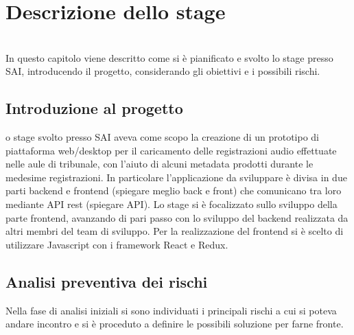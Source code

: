 
\chapter{Descrizione dello stage}
\label{cap:descrizione-stage}

\\

In questo capitolo viene descritto come si è pianificato e svolto lo stage presso SAI, introducendo il progetto, considerando gli obiettivi e i possibili rischi.

\section{Introduzione al progetto}

o stage svolto presso SAI aveva come scopo la creazione di un prototipo di piattaforma web/desktop per il caricamento delle registrazioni audio effettuate nelle aule di tribunale, con l'aiuto di alcuni metadata prodotti durante le medesime registrazioni. In particolare l'applicazione da sviluppare è divisa in due parti backend e frontend (spiegare meglio back e front) che comunicano tra loro mediante API rest (spiegare API). Lo stage si è focalizzato sullo sviluppo della parte frontend, avanzando di pari passo con lo sviluppo del  backend realizzata da altri membri del team di sviluppo. Per la realizzazione del frontend si è scelto di utilizzare Javascript con i framework React e Redux.

\section{Analisi preventiva dei rischi}

Nella fase di analisi iniziali si sono individuati i principali rischi a cui si poteva andare incontro e si è proceduto a definire le possibili soluzione per farne fronte.\\

